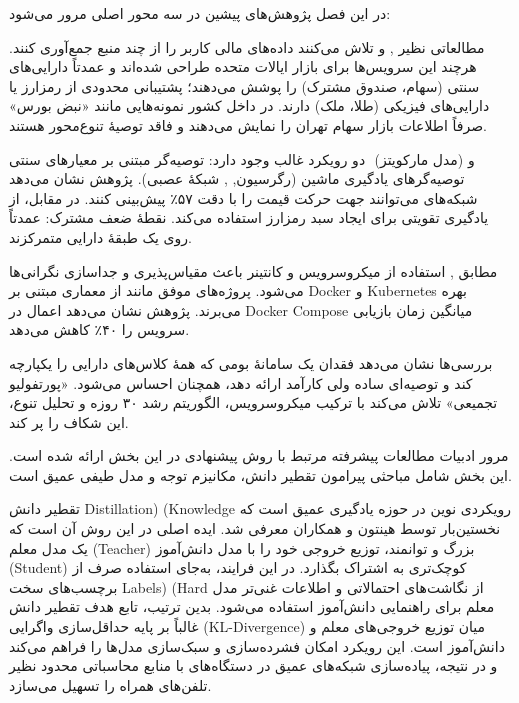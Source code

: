 
در این فصل پژوهش‌های پیشین در سه محور اصلی مرور می‌شود:

مطالعاتی نظیر ,  و  تلاش می‌کنند داده‌های مالی کاربر را از چند منبع جمع‌آوری کنند. هرچند این سرویس‌ها برای بازار ایالات متحده طراحی شده‌اند و عمدتاً دارایی‌های سنتی (سهام، صندوق مشترک) را پوشش می‌دهند؛ پشتیبانی محدودی از رمزارز یا دارایی‌های فیزیکی (طلا، ملک) دارند. در داخل کشور نمونه‌هایی مانند «نبض بورس» صرفاً اطلاعات بازار سهام تهران را نمایش می‌دهند و فاقد توصیهٔ تنوع‌محور هستند.

دو رویکرد غالب وجود دارد: توصیه‌گر مبتنی بر معیارهای سنتی ‎ (مدل مارکویتز) و توصیه‌گرهای یادگیری ماشین (رگرسیون, , شبکهٔ عصبی). پژوهش \cite{fischer2018deep} نشان می‌دهد شبکه‌های  می‌توانند جهت حرکت قیمت را با دقت ۵۷٪ پیش‌بینی کنند. در مقابل، \cite{jiang2017cryptocurrency} از یادگیری تقویتی برای ایجاد سبد رمزارز استفاده می‌کند. نقطهٔ ضعف مشترک: عمدتاً روی یک طبقهٔ دارایی متمرکزند.

مطابق \cite{burns2016borg}, استفاده از میکروسرویس و کانتینر باعث مقیاس‌پذیری و جداسازی نگرانی‌ها می‌شود. پروژه‌های  موفق مانند  از معماری مبتنی بر Docker و Kubernetes بهره می‌برند. پژوهش \cite{costa2020microservices} نشان می‌دهد اعمال  در Docker Compose میانگین زمان بازیابی سرویس را ۴۰٪ کاهش می‌دهد.

بررسی‌ها نشان می‌دهد فقدان یک سامانهٔ بومی که همهٔ کلاس‌های دارایی را یکپارچه کند و توصیه‌ای ساده ولی کارآمد ارائه دهد، همچنان احساس می‌شود. «پورتفولیو تجمیعی» تلاش می‌کند با ترکیب میکروسرویس، الگوریتم رشد ۳۰ روزه و تحلیل تنوع، این شکاف را پر کند.





مرور ادبیات مطالعات پیشرفته مرتبط با روش پیشنهادی در این بخش ارائه شده است. این بخش شامل مباحثی پیرامون تقطیر دانش، مکانیزم توجه و مدل طیفی عمیق است.


تقطیر دانش Distillation) (Knowledge رویکردی نوین در حوزه یادگیری عمیق است که نخستین‌بار توسط هینتون و همکاران \cite{hinton2015distillingknowledgeneuralnetwork} معرفی شد. ایده اصلی در این روش آن است که یک مدل معلم (Teacher) بزرگ و توانمند، توزیع خروجی خود را با مدل دانش‌آموز (Student) کوچک‌تری به اشتراک بگذارد. در این فرایند، به‌جای استفاده صرف از برچسب‌های سخت Labels) (Hard از نگاشت‌های احتمالاتی و اطلاعات غنی‌تر مدل معلم برای راهنمایی دانش‌آموز استفاده می‌شود. بدین ترتیب، تابع هدف تقطیر دانش غالباً بر پایه حداقل‌سازی واگرایی  (KL-Divergence) میان توزیع خروجی‌های معلم و دانش‌آموز است. این رویکرد امکان فشرده‌سازی و سبک‌سازی مدل‌ها را فراهم می‌کند و در نتیجه، پیاده‌سازی شبکه‌های عمیق در دستگاه‌های با منابع محاسباتی محدود نظیر تلفن‌های همراه را تسهیل می‌سازد.

